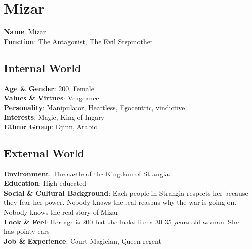 \section{Mizar}

\begin{minipage}{0.5\textwidth}
\textbf{Name}: Mizar\\
\textbf{Function}: The Antagonist, The Evil Stepmother

\subsection{Internal World}

\textbf{Age \& Gender}: 200, Female \\
\textbf{Values \& Virtues}: Vengeance \\
\textbf{Personality}: Manipulator, Heartless, Egocentric, vindictive \\
\textbf{Interests}: Magic, King of Ingary \\
\textbf{Ethnic Group}: Djinn, Arabic

\subsection{External World}
\textbf{Environment}: The castle of the Kingdom of Strangia. \\
\textbf{Education}: High-educated \\
\textbf{Social \& Cultural Background}: Each people in Strangia respects her because they fear her power. Nobody knows the real reasons why the war is going on. Nobody knows the real story of Mizar \\
\textbf{Look \& Feel}: Her age is 200 but she looks like a 30-35 years old woman. She has pointy ears  \\
\textbf{Job \& Experience}: Court Magician, Queen regent \\

\end{minipage}%
%
